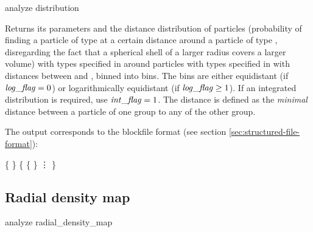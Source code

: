 \begin{pysyntax}
\end{pysyntax}

\begin{essyntax}
  analyze distribution  
\end{essyntax}
Returns its parameters and the distance distribution of particles 
(probability of finding a particle of type  at a certain distance 
around a particle of type , disregarding the fact that a spherical 
shell of a larger radius covers a larger volume) with
types specified in  around particles with
types specified in  with distances between
 and , binned into  bins. The
bins are either equidistant (if $\var{log\_flag} = 0$) or
logarithmically equidistant (if $\var{log\_flag} \geq 1$). If an
integrated distribution is required, use $\var{int\_flag}=1$. The
distance is defined as the \emph{minimal} distance between a particle
of one group to any of the other group.


The output corresponds to the blockfile format (see section
\vref{sec:structured-file-format}):
\begin{code}
\{  \} 
\{ 
  \{   \} 
  \vdots 
\}
\end{code}

\subsection{Radial density map}
\label{analyze:radialdensitymap}

\begin{essyntax}
  analyze radial_density_map    
\end{essyntax}


